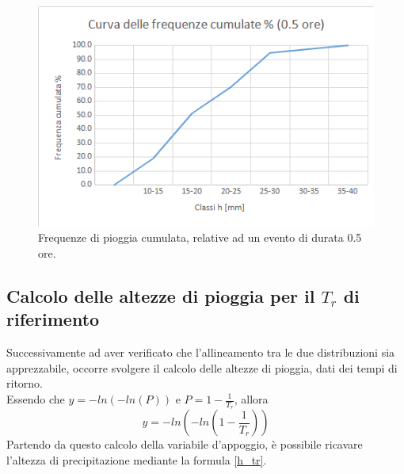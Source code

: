\begin{figure}[H]\centering
    \includegraphics[scale=.6]{immagini/freq_piogg_cum_05ore.png}
    \caption{Frequenze di pioggia cumulata, relative ad un evento di durata 0.5 ore.}
  \label{freq_cum_piogg_05ore}
\end{figure}

\subsection{Calcolo delle altezze di pioggia per il $T_r$ di riferimento}
Successivamente ad aver verificato che l'allineamento tra le due distribuzioni sia apprezzabile, occorre svolgere il calcolo delle altezze di pioggia, dati dei tempi di ritorno.\\
Essendo che $y = -ln(-ln(P))$ e $P = 1-\frac{1}{T_r}$, allora 
\begin{equation}
y = -ln\left(-ln\left(1-\frac{1}{T_r}\right)\right)
\end{equation}
Partendo da questo calcolo della variabile d'appoggio, è possibile ricavare l'altezza di precipitazione mediante la formula \ref{h_tr}.

